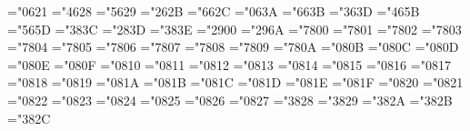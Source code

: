 \mathchardef\bfexcl="0621
\mathchardef\bflparen="4628
\mathchardef\bfrparen="5629
\mathchardef\bfplus="262B
\mathchardef\bfcomma="662C
\mathchardef\bfcolon="063A
\mathchardef\bfsemicolon="663B
\mathchardef\bfequal="363D
\mathchardef\bflbraket="465B
\mathchardef\bfrbraket="565D
\mathchardef\bflt="383C
\mathchardef\bfslash="283D
\mathchardef\bfgt="383E
\mathchardef\bfminus="2900
\mathchardef\bfvert="296A
\mathchardef\bfGamma="7800
\mathchardef\bfDelta="7801
\mathchardef\bfTheta="7802
\mathchardef\bfLambda="7803
\mathchardef\bfXi="7804
\mathchardef\bfPi="7805
\mathchardef\bfSigma="7806
\mathchardef\bfUpsilon="7807
\mathchardef\bfPhi="7808
\mathchardef\bfPsi="7809
\mathchardef\bfOmega="780A
\mathchardef\bfalpha="080B
\mathchardef\bfbeta="080C
\mathchardef\bfgamma="080D
\mathchardef\bfdelta="080E
\mathchardef\bfepsilon="080F
\mathchardef\bfzeta="0810
\mathchardef\bfeta="0811
\mathchardef\bftheta="0812
\mathchardef\bfiota="0813
\mathchardef\bfkappa="0814
\mathchardef\bflambda="0815
\mathchardef\bfmu="0816
\mathchardef\bfnu="0817
\mathchardef\bfxi="0818
\mathchardef\bfpi="0819
\mathchardef\bfrho="081A
\mathchardef\bfsigma="081B
\mathchardef\bftau="081C
\mathchardef\bfupsilon="081D
\mathchardef\bfphi="081E
\mathchardef\bfchi="081F
\mathchardef\bfpsi="0820
\mathchardef\bfomega="0821
\mathchardef\bfvarepsilon="0822
\mathchardef\bfvartheta="0823
\mathchardef\bfvarpi="0824
\mathchardef\bfvarrho="0825
\mathchardef\bfvarsigma="0826
\mathchardef\bfvarphi="0827
\mathchardef\bfleftharpoonup="3828
\mathchardef\bfleftharpoondown="3829
\mathchardef\bfrightharpoonup="382A
\mathchardef\bfrightharpoondown="382B
\mathchardef\bflhook="382C
